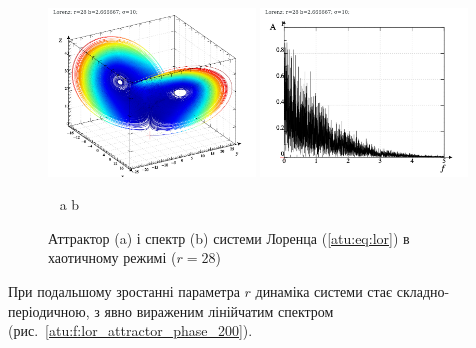 \begin{figure}[ht!]
\begin{center}
  \includegraphics[width=0.49\textwidth]{p/cha/lor/lor0-p_xyz_r=028.png}
  \hfill
  \includegraphics[width=0.49\textwidth]{p/cha/lor/lor0_fft-p_f_r=028.png}
\end{center}
  \vspace{-1.0ex}
  \begin{center}
    ~ \hfill a \hfill\hfill b \hfill ~
  \end{center}
  \vspace{-1.5ex}
  \caption{Аттрактор (a) і спектр (b) системи Лоренца (\ref{atu:eq:lor}) в хаотичному режимі ($r = 28$)}
\label{atu:f:lor_attractor_phase_chaos28}
\end{figure}

При подальшому зростанні параметра $r$ динаміка системи стає
складно-періодичною, з явно вираженим лінійчатим спектром
(рис.~\ref{atu:f:lor_attractor_phase_200}).

